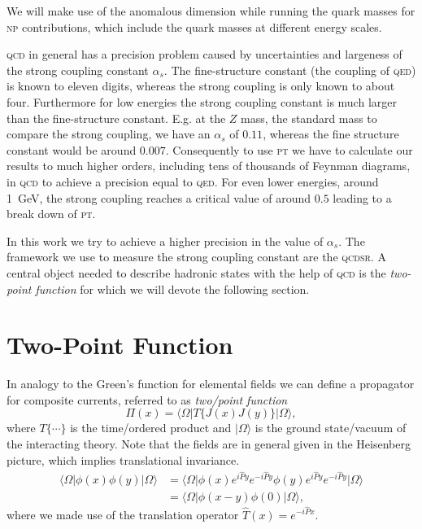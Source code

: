\documentclass[../../index.tex]{subfiles}
\begin{document}
We will make use of the anomalous dimension while running the quark masses for
\textsc{np} contributions, which include the quark masses at different
energy scales.

\textsc{qcd} in general has a precision problem caused by uncertainties and
largeness of the strong coupling constant \(\alpha_s\). The fine-structure
constant (the coupling of \textsc{qed}) is known to eleven digits, whereas the
strong coupling is only known to about four. Furthermore for low energies the
strong coupling constant is much larger than the fine-structure constant. E.g.
at the \(Z\) mass, the standard mass to compare the strong coupling, we have an
\(\alpha_s\) of \(0.11\), whereas the fine structure constant would be around
\(0.007\). Consequently to use \textsc{pt} we have to calculate our results to
much higher orders, including tens of thousands of Feynman diagrams, in
\textsc{qcd} to achieve a precision equal to \textsc{qed}. For even lower
energies, around \SI{1}{\giga\eV}, the strong coupling reaches a critical value
of around \(0.5\) leading to a break down of \textsc{pt}.

In this work we try to achieve a higher precision in the value of \(\alpha_s\).
The framework we use to measure the strong coupling constant are the
\textsc{qcdsr}. A central object needed to describe hadronic states with the
help of \textsc{qcd} is the \textit{two-point function} for which we will devote
the following section.

\section{Two-Point Function}
\label{sec:twoPointFunction}
In analogy to the Green's function for elemental fields we can define a propagator
for composite currents, referred to as \textit{two\-/point function}
\begin{equation}
  \Pi(x) = \langle\Omega\vert T\{J(x)J(y)\} \vert\Omega\rangle,
\end{equation}
where \(T\{\cdots\}\) is the time\-/ordered product and \(\vert\Omega\rangle\)
is the ground state/vacuum of the interacting theory. Note that the fields are
in general given in the Heisenberg picture, which implies translational
invariance.
\begin{equation}
  \begin{split}
    \langle\Omega\vert \phi(x)\phi(y) \vert\Omega\rangle &= \langle\Omega\vert \phi(x) e^{i\hat P y}e^{-i\hat P y}\phi(y)e^{i\hat P y}e^{-i\hat P y} \vert\Omega\rangle \\
    &= \langle\Omega\vert \phi(x-y)\phi(0) \vert\Omega\rangle,
  \end{split}
\end{equation}
where we made use of the translation operator \(\hat T(x) = e^{-i \hat P x}\).
\end{document}
